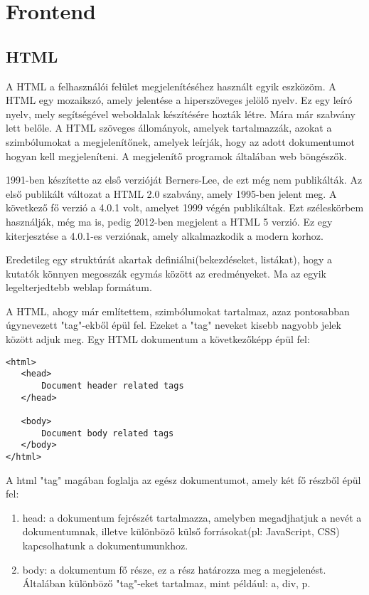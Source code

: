 \section{Frontend}
\subsection{HTML}
A HTML a felhasználói felület megjelenítéséhez használt egyik eszközöm. A HTML egy mozaikszó, amely jelentése a hiperszöveges jelölő nyelv. Ez egy leíró nyelv, mely segítségével weboldalak készítésére hozták létre. Mára már szabvány lett belőle. A HTML szöveges állományok, amelyek tartalmazzák, azokat a szimbólumokat a megjelenítőnek, amelyek leírják, hogy az adott dokumentumot hogyan kell megjeleníteni. A megjelenítő programok általában web böngészők. 

1991-ben készítette az első verzióját Berners-Lee, de ezt még nem publikálták. Az első publikált változat a HTML 2.0 szabvány, amely 1995-ben jelent meg. A következő fő verzió a 4.0.1 volt, amelyet 1999 végén publikáltak. Ezt széleskörbem használják, még ma is, pedig 2012-ben megjelent a HTML 5 verzió. Ez egy kiterjesztése a 4.0.1-es verziónak, amely alkalmazkodik a modern korhoz. 

Eredetileg egy struktúrát akartak definiálni(bekezdéseket, listákat), hogy a kutatók könnyen megosszák egymás között az eredményeket. Ma az egyik legelterjedtebb weblap formátum. 

A HTML, ahogy már említettem, szimbólumokat tartalmaz, azaz pontosabban úgynevezett "tag"-ekből épül fel. Ezeket a "tag" neveket kisebb nagyobb jelek között adjuk meg. Egy HTML dokumentum a következőképp épül fel:
\begin{verbatim}
<html>
   <head>
       Document header related tags
   </head>

   <body>
       Document body related tags
   </body>
</html>
\end{verbatim}
A html "tag" magában foglalja az egész dokumentumot, amely két fő részből épül fel:
\begin{enumerate}
    \item head: a dokumentum fejrészét tartalmazza, amelyben megadjhatjuk a nevét a dokumentumnak, illetve különböző külső forrásokat(pl: JavaScript, CSS) kapcsolhatunk a dokumentumunkhoz.
    \item body: a dokumentum fő része, ez a rész határozza meg a megjelenést. Általában különböző "tag"-eket tartalmaz, mint például: a, div, p.
\end{enumerate}



